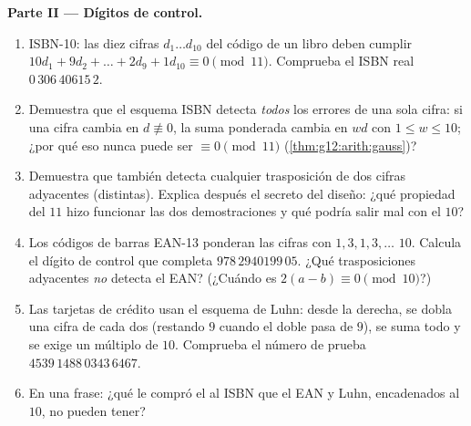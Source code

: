 \begin{problem}
\medskip
\noindent\textbf{Parte II --- Dígitos de control.}
\begin{enumerate}[resume]
  \item ISBN-10: las diez cifras $d_1 \dots d_{10}$ del código de un libro
        deben cumplir
        $10d_1 + 9d_2 + \dots + 2d_9 + 1d_{10} \equiv 0 \pmod{11}$.
        Comprueba el ISBN real $0\,306\,40615\,2$.
  \item Demuestra que el esquema ISBN detecta \emph{todos} los errores de
        una sola cifra: si una cifra cambia en $d \not\equiv 0$, la suma
        ponderada cambia en $w d$ con $1 \leq w \leq 10$; ¿por qué eso
        nunca puede ser $\equiv 0 \pmod{11}$ (\cref{thm:g12:arith:gauss})?
  \item Demuestra que también detecta cualquier trasposición de dos cifras
        adyacentes (distintas). Explica después el secreto del diseño: ¿qué
        propiedad del $11$ hizo funcionar las dos demostraciones y qué
        podría salir mal con el  $10$?
  \item Los códigos de barras EAN-13 ponderan las cifras con
        $1, 3, 1, 3, \dots$  $10$. Calcula el dígito de control que
        completa $978\,2940199\,05$. ¿Qué trasposiciones adyacentes
        \emph{no} detecta el EAN? (¿Cuándo es
        $2(a - b) \equiv 0 \pmod{10}$?)
  \item Las tarjetas de crédito usan el esquema de Luhn: desde la derecha,
        se dobla una cifra de cada dos (restando $9$ cuando el doble pasa
        de $9$), se suma todo y se exige un múltiplo de $10$. Comprueba el
        número de prueba $4539\,1488\,0343\,6467$.
  \item En una frase: ¿qué le compró el   al ISBN que el EAN y
        Luhn, encadenados al $10$, no pueden tener?
\end{enumerate}


\end{problem}
